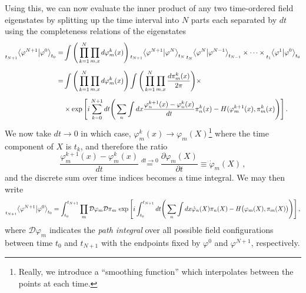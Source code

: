 \documentclass{article}
\numberwithin{equation}{subsection}
\begin{document}
Using this, we can now evaluate the inner product of any two time-ordered field eigenstates by splitting up the time interval into $N$ parts each separated by $dt$ using the completeness 
relations of the eigenstates
\begin{equation}\begin{split}
    \prescript{}{t_{N+1}}{\braket{\varphi^{N+1}}{\varphi^0}_{t_0}} =& \int\Bigg(\prod_{k=1}^N\prod_{m,x}d\varphi^k_m(x)\Bigg)\prescript{}{t_{N+1}}{\braket{\varphi^{N+1}}{\varphi^N}_{t_N}}
	\prescript{}{t_N}{\braket{\varphi^{N}}{\varphi^{N-1}}_{t_{N-1}}}\times\dots\times \prescript{}{t_{1}}{\braket{\varphi^{1}}{\varphi^0}_{t_0}} \\[0.5em]
    =& \int\Bigg(\prod_{k=1}^N\prod_{m,x}d\varphi^k_m(x)\Bigg)\int\Bigg(\prod_{k=1}^N\prod_{m,x}\frac{d\pi^k_m(x)}{2\pi}\Bigg)\times \\[0.5em]
    &\times \exp\Bigg[i\sum_{k = 0}^{N+1}dt\Bigg(\sum_n\int dx\frac{\varphi^{k+1}_n(x) - \varphi^k_n(x)}{dt}\pi^k_n(x) - H(\varphi^{k+1}_m(x), \pi^k_m(x)\Bigg)\Bigg]\,.
\end{split}\end{equation}
We now take $dt\to 0$ in which case, $\varphi^k_m(x) \to \varphi_m(X)$\footnote{Really, we introduce a ``smoothing function'' which interpolates between the points at each time.} 
where the time component of $X$ is $t_k$, and therefore the ratio
\begin{equation}
    \frac{\varphi^{k+1}_m(x) - \varphi^k_m(x)}{dt} \overset{dt\to 0}{=} \frac{\partial\varphi_m(X)}{\partial t} \equiv \dot{\varphi}_m(X)\,,
\end{equation}
and the discrete sum over time indices becomes a time integral. We may then write
\begin{equation}\label{eq:inProd}
    \prescript{}{t_{N+1}}{\braket{\varphi^{N+1}}{\varphi^0}_{t_0}} = \int_{t_0}^{t_{N+1}}\prod_m\mathcal{D}\varphi_m\mathcal{D}\pi_m\,\exp\Bigg[i\int_{t_0}^{t_{N+1}}dt
	\Bigg(\sum_n\int dx\dot{\varphi}_n(X)\pi_n(X) - H\big(\varphi_m(X), \pi_m(X)\big)\Bigg)\Bigg]\,,
\end{equation}
where $\mathcal{D}\varphi_m$ indicates the \textit{path integral} over all possible field configurations between time $t_0$ and $t_{N+1}$ with the endpoints fixed by $\varphi^0$ 
and $\varphi^{N+1}$, respectively.
\end{document}
